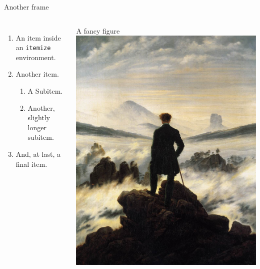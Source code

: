 \documentclass{beamer}
\begin{document}
\begin{frame}{Another frame}
\begin{columns}
	\begin{enumerate}
		\item An item inside an \texttt{itemize} environment.
		\item Another item.
		\begin{enumerate}
			\item A Subitem.
			\item Another, slightly longer subitem.
		\end{enumerate}
		\item And, at last, a final item.
	\end{enumerate}
	\begin{fancyblock}[
	innertopmargin=0pt,
	innerbottommargin=0pt,
	innerleftmargin=0pt,
	innerrightmargin=0pt]{A fancy figure}
		\includegraphics[width=\textwidth]{wanderer}
	\end{fancyblock}
\end{columns}
\end{frame}
\end{document}
